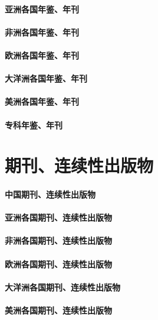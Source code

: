 \documentclass[UTF8]{../ApplicationUniverse}
\begin{document}
\subsubsection{亚洲各国年鉴、年刊}
\subsubsection{非洲各国年鉴、年刊}
\subsubsection{欧洲各国年鉴、年刊}
\subsubsection{大洋洲各国年鉴、年刊}
\subsubsection{美洲各国年鉴、年刊}
\subsubsection{专科年鉴、年刊}






\chapter{期刊、连续性出版物}
\subsubsection{中国期刊、连续性出版物}
\subsubsection{亚洲各国期刊、连续性出版物}
\subsubsection{非洲各国期刊、连续性出版物}
\subsubsection{欧洲各国期刊、连续性出版物}
\subsubsection{大洋洲各国期刊、连续性出版物}
\subsubsection{美洲各国期刊、连续性出版物}
\end{document}

